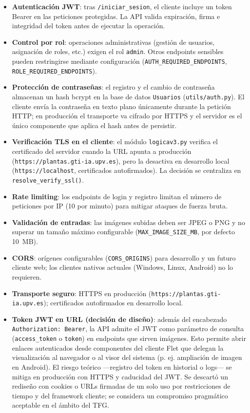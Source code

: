\documentclass[11pt,spanish,listoffigures,listoftables]{tfgetsinf}
\begin{document}
\begin{itemize}
    \item \textbf{Autenticación JWT}: tras \texttt{/iniciar\_sesion}, el cliente incluye un token Bearer en las peticiones protegidas. La API valida expiración, firma e integridad del token antes de ejecutar la operación.
    \item \textbf{Control por rol}: operaciones administrativas (gestión de usuarios, asignación de roles, etc.) exigen el rol \texttt{admin}. Otros endpoints sensibles pueden restringirse mediante configuración (\texttt{AUTH\_REQUIRED\_ENDPOINTS}, \texttt{ROLE\_REQUIRED\_ENDPOINTS}).
    \item \textbf{Protección de contraseñas}: el registro y el cambio de contraseña almacenan un hash bcrypt en la base de datos \texttt{Usuarios} (\texttt{utils/auth.py}). El cliente envía la contraseña en texto plano únicamente durante la petición HTTP; en producción el transporte va cifrado por HTTPS y el servidor es el único componente que aplica el hash antes de persistir.
    \item \textbf{Verificación TLS en el cliente}: el módulo \texttt{logicav3.py} verifica el certificado del servidor cuando la URL apunta a producción (\texttt{https://plantas.gti-ia.upv.es}), pero la desactiva en desarrollo local (\texttt{https://localhost}, certificados autofirmados). La decisión se centraliza en \texttt{resolve\_verify\_ssl()}.
    \item \textbf{Rate limiting}: los endpoints de login y registro limitan el número de peticiones por IP (10 por minuto) para mitigar ataques de fuerza bruta.
    \item \textbf{Validación de entradas}: las imágenes subidas deben ser JPEG o PNG y no superar un tamaño máximo configurable (\texttt{MAX\_IMAGE\_SIZE\_MB}, por defecto 10~MB).
    \item \textbf{CORS}: orígenes configurables (\texttt{CORS\_ORIGINS}) para desarrollo y un futuro cliente web; los clientes nativos actuales (Windows, Linux, Android) no lo requieren.
    \item \textbf{Transporte seguro}: HTTPS en producción (\texttt{https://plantas.gti-ia.upv.es}); certificados autofirmados en desarrollo local.
    \item \textbf{Token JWT en URL (decisión de diseño)}: además del encabezado \texttt{Authorization: Bearer}, la API admite el JWT como parámetro de consulta (\texttt{access\_token} o \texttt{token}) en endpoints que sirven imágenes. Esto permite abrir enlaces autenticados desde componentes del cliente Flet que delegan la visualización al navegador o al visor del sistema (p. ej. ampliación de imagen en Android). El riesgo teórico ---registro del token en historial o logs--- se mitiga en producción con HTTPS y caducidad del JWT. Se descartó un rediseño con cookies o URLs firmadas de un solo uso por restricciones de tiempo y del framework cliente; se considera un compromiso pragmático aceptable en el ámbito del TFG.
\end{itemize}
\end{document}
